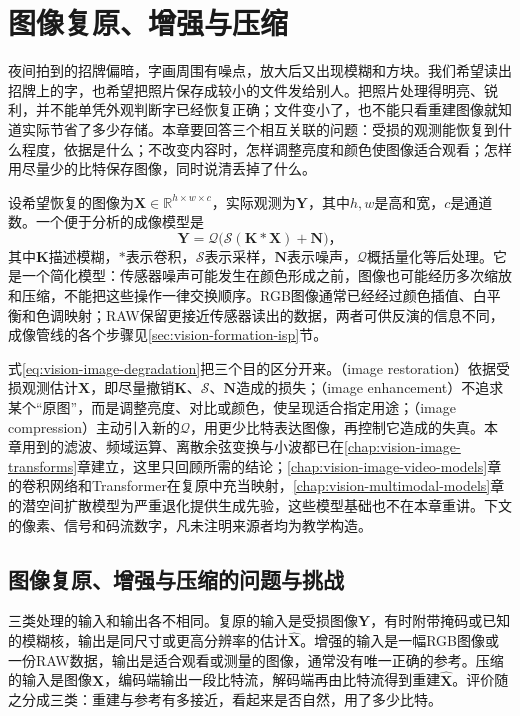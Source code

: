 \chapter{图像复原、增强与压缩}
\label{chap:vision-image-restoration}

夜间拍到的招牌偏暗，字画周围有噪点，放大后又出现模糊和方块。我们希望读出招牌上的字，也希望把照片保存成较小的文件发给别人。把照片处理得明亮、锐利，并不能单凭外观判断字已经恢复正确；文件变小了，也不能只看重建图像就知道实际节省了多少存储。本章要回答三个相互关联的问题：受损的观测能恢复到什么程度，依据是什么；不改变内容时，怎样调整亮度和颜色使图像适合观看；怎样用尽量少的比特保存图像，同时说清丢掉了什么。

设希望恢复的图像为$\bm{X}\in\mathbb{R}^{h\times w\times c}$，实际观测为$\bm{Y}$，其中$h,w$是高和宽，$c$是通道数。一个便于分析的成像模型是
\begin{equation}
 \bm{Y}=\mathcal{Q}\bigl(\mathcal{S}(\bm{K}*\bm{X})+\bm{N}\bigr)\text{，}
 \label{eq:vision-image-degradation}
\end{equation}
其中$\bm{K}$描述模糊，$*$表示卷积，$\mathcal{S}$表示采样，$\bm{N}$表示噪声，$\mathcal{Q}$概括量化等后处理。它是一个简化模型：传感器噪声可能发生在颜色形成之前，图像也可能经历多次缩放和压缩，不能把这些操作一律交换顺序。RGB图像通常已经经过颜色插值、白平衡和色调映射；RAW保留更接近传感器读出的数据，两者可供反演的信息不同，成像管线的各个步骤见\ref{sec:vision-formation-isp}节。

式\eqref{eq:vision-image-degradation}把三个目的区分开来。（image restoration）依据受损观测估计$\bm{X}$，即尽量撤销$\bm{K}$、$\mathcal{S}$、$\bm{N}$造成的损失；（image enhancement）不追求某个“原图”，而是调整亮度、对比或颜色，使呈现适合指定用途；（image compression）主动引入新的$\mathcal{Q}$，用更少比特表达图像，再控制它造成的失真。本章用到的滤波、频域运算、离散余弦变换与小波都已在\ref{chap:vision-image-transforms}章建立，这里只回顾所需的结论；\ref{chap:vision-image-video-models}章的卷积网络和Transformer在复原中充当映射，\ref{chap:vision-multimodal-models}章的潜空间扩散模型为严重退化提供生成先验，这些模型基础也不在本章重讲。下文的像素、信号和码流数字，凡未注明来源者均为教学构造。

\section{图像复原、增强与压缩的问题与挑战}
\label{sec:vision-restoration-challenges}

三类处理的输入和输出各不相同。复原的输入是受损图像$\bm{Y}$，有时附带掩码或已知的模糊核，输出是同尺寸或更高分辨率的估计$\widehat{\bm{X}}$。增强的输入是一幅RGB图像或一份RAW数据，输出是适合观看或测量的图像，通常没有唯一正确的参考。压缩的输入是图像$\bm{X}$，编码端输出一段比特流，解码端再由比特流得到重建$\widehat{\bm{X}}$。评价随之分成三类：重建与参考有多接近，看起来是否自然，用了多少比特。

